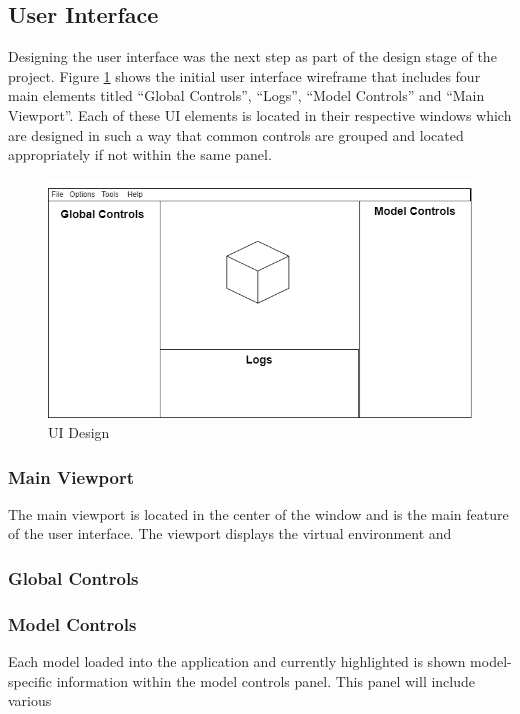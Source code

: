 \documentclass[11pt]{article}
\begin{document}
\subsection{User Interface}
Designing the user interface was the next step as part of the design stage of
the project. Figure \ref{fig:ui_design} shows the initial user interface
wireframe that includes four main elements titled ``Global Controls'', ``Logs'',
``Model Controls'' and ``Main Viewport''. Each of these UI elements is located
in their respective windows which are designed in such a way that common
controls are grouped and located appropriately if not within the same panel.

\begin{figure}[ht]
  \centering
  \includegraphics[width=\textwidth]{images/ui_design.png}
  \caption{UI Design}
  \label{fig:ui_design}
\end{figure}

\subsubsection{Main Viewport}
The main viewport is located in the center of the window and is the main feature
of the user interface. The viewport displays the virtual environment and 

\subsubsection{Global Controls}

\subsubsection{Model Controls}

Each model loaded into the application and currently highlighted is shown
model-specific information within the model controls panel. This panel will include various 
\end{document}
